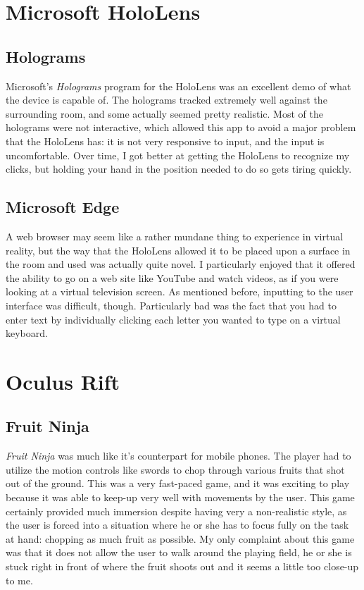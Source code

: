 \documentclass[11pt]{article}
\begin{document}
\section{Microsoft HoloLens}
\subsection{Holograms}
Microsoft's \textit{Holograms} program for the HoloLens was an excellent demo of what the 
device is capable of. The holograms tracked extremely well against the surrounding room,
and some actually seemed pretty realistic. Most of the holograms were not interactive,
which allowed this app to avoid a major problem that the HoloLens has: it is not very
responsive to input, and the input is uncomfortable. Over time, I got better at getting
the HoloLens to recognize my clicks, but holding your hand in the position needed to do so
gets tiring quickly.
\subsection{Microsoft Edge}
A web browser may seem like a rather mundane thing to experience in virtual reality, but
the way that the HoloLens allowed it to be placed upon a surface in the room and used was
actually quite novel. I particularly enjoyed that it offered the ability to go on a web
site like YouTube and watch videos, as if you were looking at a virtual television
screen. As mentioned before, inputting to the user interface was difficult, though.
Particularly bad was the fact that you had to enter text by individually clicking each
letter you wanted to type on a virtual keyboard.
\section{Oculus Rift}
\subsection{Fruit Ninja}
\textit{Fruit Ninja} was much like it's counterpart for mobile phones. The player had to
utilize the motion controls like swords to chop through various fruits that shot out of
the ground. This was a very fast-paced game, and it was exciting to play because it
was able to keep-up very well with movements by the user. This game certainly provided
much immersion despite having very a non-realistic style, as the user is forced into a
situation where he or she has to focus fully on the task at hand: chopping as much fruit
as possible. My only complaint about this game was that it does not allow the user to walk
around the playing field, he or she is stuck right in front of where the fruit shoots out
and it seems a little too close-up to me.
\end{document}
